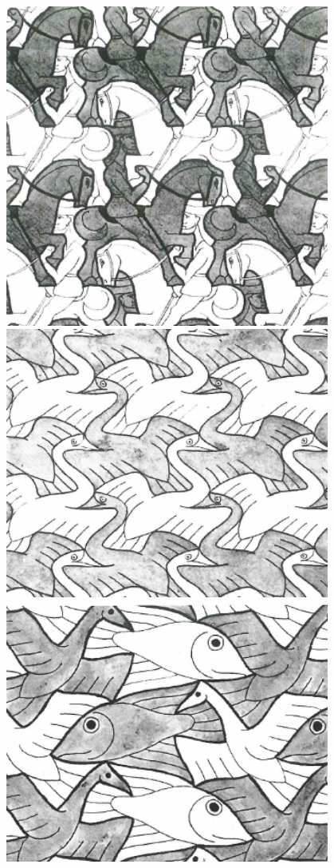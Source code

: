 \documentclass[a4paper]{report}
\theoremstyle{definition}
\begin{document}
  \begin{center}
    \includegraphics[width=0.8\textwidth]{escher1}
    \includegraphics[width=0.8\textwidth]{escher2}
    \includegraphics[width=0.8\textwidth]{escher3}

\end{center}
\end{document}
